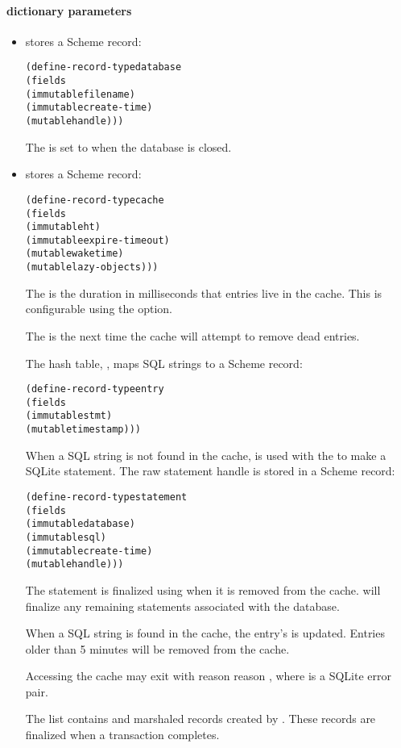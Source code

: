 \paragraph* {dictionary parameters}
\begin{itemize}

\item {} stores a Scheme record:
  \begin{alltt}
(define-record-type database
  (fields
   (immutable filename)
   (immutable create-time)
   (mutable handle)))
  \end{alltt}\antipar
  The  is set to  when the database is closed.

\item {} stores a Scheme record:
  \begin{alltt}
(define-record-type cache
  (fields
   (immutable ht)
   (immutable expire-timeout)
   (mutable waketime)
   (mutable lazy-objects)))
  \end{alltt}\antipar
  The  is the duration in milliseconds that
  entries live in the cache. This is configurable using the
   option.

  The  is the next time the cache will attempt to
  remove dead entries.

  The hash table, , maps SQL strings to a Scheme record:
  \begin{alltt}
(define-record-type entry
  (fields
   (immutable stmt)
   (mutable timestamp)))
  \end{alltt}\antipar

  When a SQL string is not found in the cache,
   is used with the
   to make a SQLite statement. The raw
  statement handle is stored in a Scheme record:
  \begin{alltt}
(define-record-type statement
  (fields
   (immutable database)
   (immutable sql)
   (immutable create-time)
   (mutable handle)))
  \end{alltt}\antipar
  The statement is finalized using 
  when it is removed from the cache.  will
  finalize any remaining statements associated with the database.

  When a SQL string is found in the cache, the entry's
   is updated. Entries older than 5 minutes will
  be removed from the cache.

  Accessing the cache may exit with reason reason
  , where
   is a SQLite error pair.

  The  list contains 
  and marshaled  records created by .
  These records are finalized when a transaction completes.

\end{itemize}

